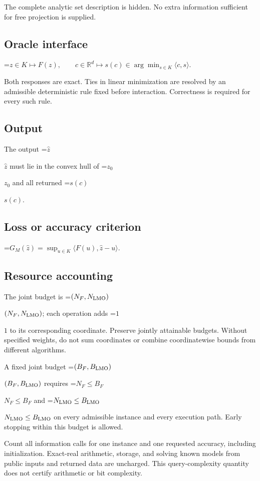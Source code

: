 \documentclass[10pt,a4paper]{article}
\newcommand{\AtlasMath}[1]{\par\begingroup\centering\setbox0=\hbox{$\displaystyle #1$}\ifdim\wd0>1.4\linewidth\typeout{ATLAS WIDE FORMULA: \the\wd0}\fi\ifdim\wd0>\linewidth\resizebox{\linewidth}{!}{\box0}\else\box0\fi\par\endgroup}
\newcommand{\AtlasInlineMath}[1]{\begingroup\setbox0=\hbox{$#1$}\ifdim\wd0>.4\linewidth\endgroup\AtlasMath{#1}\else\endgroup$#1$\fi}
\begin{document}
The complete analytic set description is hidden. No extra information sufficient for free projection is supplied.

\subsection{Oracle interface}

\AtlasMath{z\in K\longmapsto F(z),\qquad c\in\mathbb{R}^d\longmapsto s(c)\in\arg\min_{s\in K}\langle c,s\rangle.}


Both responses are exact. Ties in linear minimization are resolved by an admissible deterministic rule fixed before interaction. Correctness is required for every such rule.

\subsection{Output}
The output \AtlasInlineMath{\widehat{z}} must lie in the convex hull of \AtlasInlineMath{z_0} and all returned \AtlasInlineMath{s(c)}.

\subsection{Loss or accuracy criterion}

\AtlasMath{G_M(\widehat{z})=\sup_{u\in K}\langle F(u),\widehat{z}-u\rangle.}


\subsection{Resource accounting}
The joint budget is \AtlasInlineMath{(N_F,N_{\rm LMO})}; each operation adds \AtlasInlineMath{1} to its corresponding coordinate. Preserve jointly attainable budgets. Without specified weights, do not sum coordinates or combine coordinatewise bounds from different algorithms.

A fixed joint budget \AtlasInlineMath{(B_F,B_{\rm LMO})} requires \AtlasInlineMath{N_F\le B_F} and \AtlasInlineMath{N_{\rm LMO}\le B_{\rm LMO}} on every admissible instance and every execution path. Early stopping within this budget is allowed.

Count all information calls for one instance and one requested accuracy, including initialization. Exact-real arithmetic, storage, and solving known models from public inputs and returned data are uncharged. This query-complexity quantity does not certify arithmetic or bit complexity.
\end{document}
